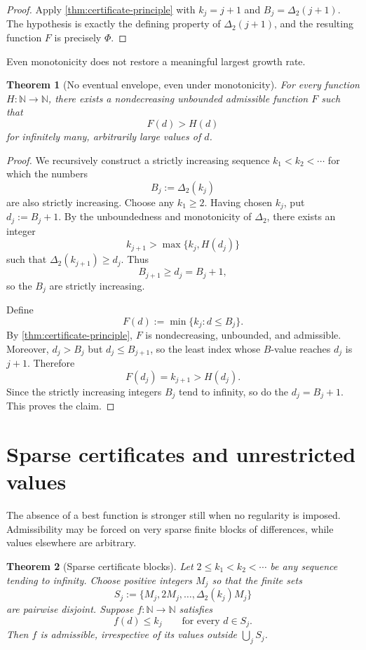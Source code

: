 \documentclass[11pt]{article}
\newtheorem{theorem}{Theorem}[section]
\theoremstyle{definition}
\theoremstyle{remark}
\newcommand{\N}{\mathbb N}
\newcommand{\DeltaTwo}{\Delta_{2}}
\newcommand{\PhiTwo}{\Phi}
\begin{document}
\begin{proof}
Apply \cref{thm:certificate-principle} with $k_j=j+1$ and $B_j=\DeltaTwo(j+1)$. The hypothesis is exactly the defining property of $\DeltaTwo(j+1)$, and the resulting function $F$ is precisely $\PhiTwo$.
\end{proof}

Even monotonicity does not restore a meaningful largest growth rate.

\begin{theorem}[No eventual envelope, even under monotonicity]\label{thm:no-monotone-envelope}
For every function $H\colon\N\to\N$, there exists a nondecreasing unbounded admissible function $F$ such that
\[
F(d)>H(d)
\]
for infinitely many, arbitrarily large values of $d$.
\end{theorem}

\begin{proof}
We recursively construct a strictly increasing sequence $k_1<k_2<\cdots$ for which the numbers
\[
B_j:=\DeltaTwo(k_j)
\]
are also strictly increasing. Choose any $k_1\ge2$. Having chosen $k_j$, put $d_j:=B_j+1$. By the unboundedness and monotonicity of $\DeltaTwo$, there exists an integer
\[
k_{j+1}>\max\{k_j,H(d_j)\}
\]
such that $\DeltaTwo(k_{j+1})\ge d_j$. Thus
\[
B_{j+1}\ge d_j=B_j+1,
\]
so the $B_j$ are strictly increasing.

Define
\[
F(d):=\min\{k_j:d\le B_j\}.
\]
By \cref{thm:certificate-principle}, $F$ is nondecreasing, unbounded, and admissible. Moreover, $d_j>B_j$ but $d_j\le B_{j+1}$, so the least index whose $B$-value reaches $d_j$ is $j+1$. Therefore
\[
F(d_j)=k_{j+1}>H(d_j).
\]
Since the strictly increasing integers $B_j$ tend to infinity, so do the $d_j=B_j+1$. This proves the claim.
\end{proof}

\section{Sparse certificates and unrestricted values}

The absence of a best function is stronger still when no regularity is imposed. Admissibility may be forced on very sparse finite blocks of differences, while values elsewhere are arbitrary.

\begin{theorem}[Sparse certificate blocks]\label{thm:sparse-certificates}
Let $2\le k_1<k_2<\cdots$ be any sequence tending to infinity. Choose positive integers $M_j$ so that the finite sets
\[
S_j:=\{M_j,2M_j,\ldots,\DeltaTwo(k_j)M_j\}
\]
are pairwise disjoint. Suppose $f\colon\N\to\N$ satisfies
\begin{equation}\label{eq:sparse-values}
f(d)\le k_j\qquad\text{for every }d\in S_j.
\end{equation}
Then $f$ is admissible, irrespective of its values outside $\bigcup_jS_j$.
\end{theorem}
\end{document}

